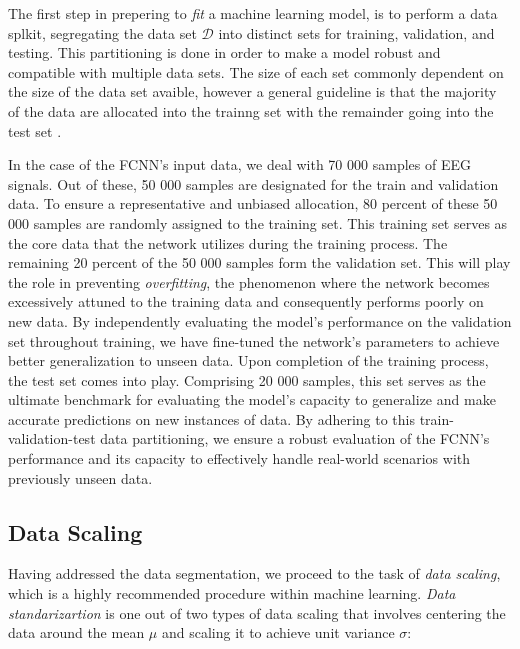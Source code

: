 \documentclass[a4paper, UKenglish, 11pt]{uiomaster}
\begin{document}
The first step in prepering to \emph{fit} a machine learning model, is to perform a data splkit, segregating the data set $\mathcal{D}$ into distinct sets for training, validation, and testing. This partitioning is done in order to make a model robust and compatible with multiple data sets. The size of each set commonly dependent on the size of the data set avaible, however a general guideline is that the majority of the data are allocated into the trainng set with the remainder going into the test set \cite{mehta2019high}.

In the case of the FCNN's input data, we deal with 70 000 samples of EEG signals. Out of these, 50 000 samples are designated for the train and validation data. To ensure a representative and unbiased allocation, 80 percent of these 50 000 samples are randomly assigned to the training set. This training set serves as the core data that the network utilizes during the training process. The remaining 20 percent of the 50 000 samples form the validation set. This will play the role in preventing \emph{overfitting}, the phenomenon where the network becomes excessively attuned to the training data and consequently performs poorly on new data. By independently evaluating the model's performance on the validation set throughout training, we have fine-tuned the network's parameters to achieve better generalization to unseen data.
Upon completion of the training process, the test set comes into play. Comprising 20 000 samples, this set serves as the ultimate benchmark for evaluating the model's capacity to generalize and make accurate predictions on new instances of data. By adhering to this train-validation-test data partitioning, we ensure a robust evaluation of the FCNN's performance and its capacity to effectively handle real-world scenarios with previously unseen data.

\subsection{Data Scaling}
Having addressed the data segmentation, we proceed to the task of \emph{data scaling}, which is a highly recommended procedure within machine learning. \emph{Data standarizartion} is one out of two types of data scaling that involves centering the data around the mean $\mu$ and scaling it to achieve unit variance $\sigma$:
\end{document}
